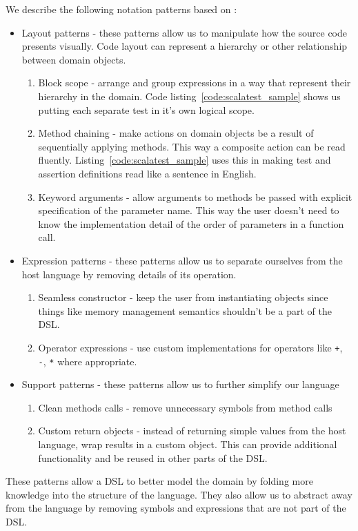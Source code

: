 We describe the following notation patterns based on \autocite{Gunther:2011}:
\begin{itemize}
	\item Layout patterns - these patterns allow us to manipulate how the source code presents visually. Code layout can represent a hierarchy or other relationship between domain objects.
	\begin{enumerate}
		\item Block scope - arrange and group expressions in a way that represent their hierarchy in the domain. Code listing~\ref{code:scalatest_sample} shows us putting each separate test in it's own logical scope.
		\item Method chaining - make actions on domain objects be a result of sequentially applying methods. This way a composite action can be read fluently. Listing~\ref{code:scalatest_sample} uses this in making test and assertion definitions read like a sentence in English.
		\item Keyword arguments - allow arguments to methods be passed with explicit specification of the parameter name. This way the user doesn't need to know the implementation detail of the order of parameters in a function call.
	\end{enumerate}
	\item Expression patterns - these patterns allow us to separate ourselves from the host language by removing details of its operation.
	\begin{enumerate}
		\item Seamless constructor - keep the user from instantiating objects since things like memory management semantics shouldn't be a part of the DSL.
		\item Operator expressions - use custom implementations for operators like \texttt{+}, \texttt{-}, \texttt{*} where appropriate.
	\end{enumerate}
	\item Support patterns - these patterns allow us to further simplify our language
	\begin{enumerate}
		\item Clean methods calls - remove unnecessary symbols from method calls
		\item Custom return objects - instead of returning simple values from the host language, wrap results in a custom object. This can provide additional functionality and be reused in other parts of the DSL.
	\end{enumerate}
\end{itemize}

These patterns allow a DSL to better model the domain by folding more knowledge into the structure of the language. They also allow us to abstract away from the language by removing symbols and expressions that are not part of the DSL.
